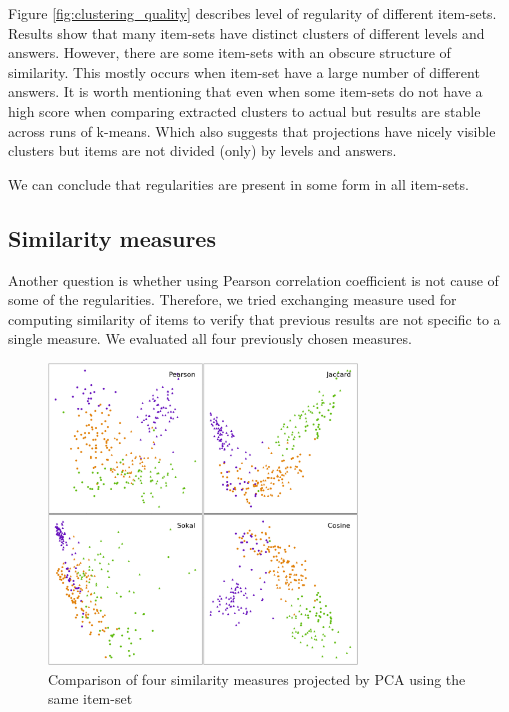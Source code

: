 \documentclass[
  digital, %
  table,   %
  nolof,     %
  nolot,     %
  nocover,
  color,
  final, %
]{fithesis3}
\begin{document}
Figure \ref{fig:clustering_quality} describes level of regularity of different item-sets. Results show that many item-sets have distinct clusters of different levels and answers. However, there are some item-sets with an obscure structure of similarity. This mostly occurs when item-set have a large number of different answers. It is worth mentioning that even when some item-sets do not have a high score when comparing extracted clusters to actual but results are stable across runs of k-means. Which also suggests that projections have nicely visible clusters but items are not divided (only) by levels and answers.


We can conclude that regularities are present in some form in all item-sets.


\subsection{Similarity measures}\label{evaluation-similarity-measures}

Another question is whether using Pearson correlation coefficient is not cause of some of the regularities. Therefore, we tried exchanging measure used for computing similarity of items to verify that previous results are not specific to a single measure. We evaluated all four previously chosen measures.

\begin{figure}
  \includegraphics[height=8cm]{img/measures}
  \caption{Comparison of four similarity measures projected by PCA using the same item-set}
  \label{fig:measures}
\end{figure}

\end{document}
